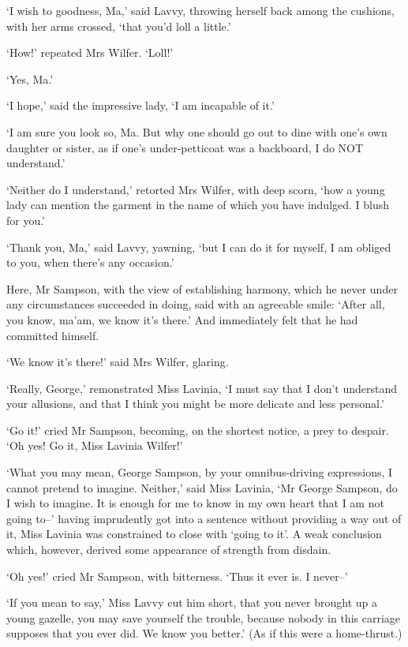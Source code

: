 ‘I wish to goodness, Ma,’ said Lavvy, throwing herself back among the
cushions, with her arms crossed, ‘that you’d loll a little.’

‘How!’ repeated Mrs Wilfer. ‘Loll!’

‘Yes, Ma.’

‘I hope,’ said the impressive lady, ‘I am incapable of it.’

‘I am sure you look so, Ma. But why one should go out to dine with one’s
own daughter or sister, as if one’s under-petticoat was a backboard, I
do NOT understand.’

‘Neither do I understand,’ retorted Mrs Wilfer, with deep scorn, ‘how
a young lady can mention the garment in the name of which you have
indulged. I blush for you.’

‘Thank you, Ma,’ said Lavvy, yawning, ‘but I can do it for myself, I am
obliged to you, when there’s any occasion.’

Here, Mr Sampson, with the view of establishing harmony, which he never
under any circumstances succeeded in doing, said with an agreeable
smile: ‘After all, you know, ma’am, we know it’s there.’ And immediately
felt that he had committed himself.

‘We know it’s there!’ said Mrs Wilfer, glaring.

‘Really, George,’ remonstrated Miss Lavinia, ‘I must say that I don’t
understand your allusions, and that I think you might be more delicate
and less personal.’

‘Go it!’ cried Mr Sampson, becoming, on the shortest notice, a prey to
despair. ‘Oh yes! Go it, Miss Lavinia Wilfer!’

‘What you may mean, George Sampson, by your omnibus-driving expressions,
I cannot pretend to imagine. Neither,’ said Miss Lavinia, ‘Mr George
Sampson, do I wish to imagine. It is enough for me to know in my own
heart that I am not going to--’ having imprudently got into a sentence
without providing a way out of it, Miss Lavinia was constrained to
close with ‘going to it’. A weak conclusion which, however, derived some
appearance of strength from disdain.

‘Oh yes!’ cried Mr Sampson, with bitterness. ‘Thus it ever is. I
never--’

‘If you mean to say,’ Miss Lavvy cut him short, that you never brought
up a young gazelle, you may save yourself the trouble, because nobody
in this carriage supposes that you ever did. We know you better.’ (As if
this were a home-thrust.)


